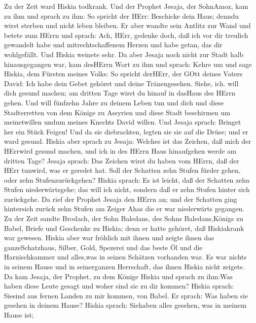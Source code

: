  Zu der Zeit ward Hiskia todkrank. Und der Prophet Jesaja,
der SohnAmoz, kam zu ihm und sprach zu ihm: So spricht der HErr:
Beschicke dein Haus; denndu wirst sterben und nicht leben bleiben.
 Er aber wandte sein Antlitz zur Wand und betete zum HErrn
und sprach:  Ach, HErr, gedenke doch, daß ich vor dir
treulich gewandelt habe und mitrechtschaffenem Herzen und habe getan,
das dir wohlgefällt. Und Hiskia weinete sehr.  Da aber
Jesaja noch nicht zur Stadt halb hinausgegangen war, kam desHErrn Wort
zu ihm und sprach:  Kehre um und sage Hiskia, dem Fürsten
meines Volks: So spricht derHErr, der GOtt deines Vaters David: Ich habe
dein Gebet gehöret und deine Tränengesehen. Siehe, ich. will dich gesund
machen; am dritten Tage wirst du hinauf in dasHaus des HErrn gehen.
 Und will fünfzehn Jahre zu deinem Leben tun und dich und
diese Stadterretten von dem Könige zu Assyrien und diese Stadt
beschirmen um meinetwillen undum meines Knechts David willen.
 Und Jesaja sprach: Bringet her ein Stück Feigen! Und da sie
diebrachten, legten sie sie auf die Drüse; und er ward gesund.
 Hiskia aber sprach zu Jesaja: Welches ist das Zeichen, daß
mich der HErrwird gesund machen, und ich in des HErrn Haus hinaufgehen
werde am dritten Tage?  Jesaja sprach: Das Zeichen wirst du
haben vom HErrn, daß der HErr tunwird, was er geredet hat. Soll der
Schatten zehn Stufen fürder gehen, oder zehn Stufenzurückgehen?
 Hiskia sprach: Es ist leicht, daß der Schatten zehn Stufen
niederwärtsgehe; das will ich nicht, sondern daß er zehn Stufen hinter
sich zurückgehe.  Da rief der Prophet Jesaja den HErrn an;
und der Schatten ging hintersich zurück zehn Stufen am Zeiger Ahas die
er war niederwärts gegangen.  Zu der Zeit sandte Brodach,
der Sohn Baledans, des Sohns Baledans,Königs zu Babel, Briefe und
Geschenke zu Hiskia; denn er hatte gehöret, daß Hiskiakrank war gewesen.
 Hiskia aber war fröhlich mit ihnen und zeigte ihnen das
ganzeSchatzhaus, Silber, Gold, Spezerei und das beste Öl und die
Harnischkammer und alles,was in seinen Schätzen vorhanden war. Es war
nichts in seinem Hause und in seinerganzen Herrschaft, das ihnen Hiskia
nicht zeigete.  Da kam Jesaja, der Prophet, zu dem Könige
Hiskia und sprach zu ihm:Was haben diese Leute gesagt und woher sind sie
zu dir kommen? Hiskia sprach: Siesind aus fernen Landen zu mir kommen,
von Babel.  Er sprach: Was haben sie gesehen in deinem
Hause? Hiskia sprach: Siehaben alles gesehen, was in meinem Hause ist;
